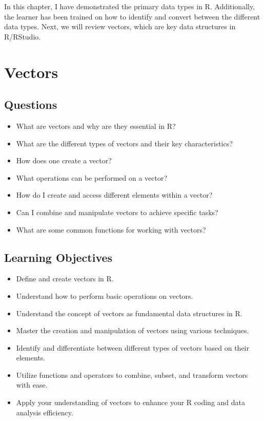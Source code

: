 \documentclass[
  letterpaper,
  DIV=11,
  numbers=noendperiod]{scrreprt}
\begin{document}
In this chapter, I have demonstrated the primary data types in R.
Additionally, the learner has been trained on how to identify and
convert between the different data types. Next, we will review vectors,
which are key data structures in R/RStudio.


\chapter{Vectors}\label{sec-vectors}

\section{Questions}\label{questions-8}

\begin{itemize}
\item
  What are vectors and why are they essential in R?
\item
  What are the different types of vectors and their key characteristics?
\item
  How does one create a vector?
\item
  What operations can be performed on a vector?
\item
  How do I create and access different elements within a vector?
\item
  Can I combine and manipulate vectors to achieve specific tasks?
\item
  What are some common functions for working with vectors?
\end{itemize}

\section{Learning Objectives}\label{learning-objectives-8}

\begin{itemize}
\item
  Define and create vectors in R.
\item
  Understand how to perform basic operations on vectors.
\item
  Understand the concept of vectors as fundamental data structures in R.
\item
  Master the creation and manipulation of vectors using various
  techniques.
\item
  Identify and differentiate between different types of vectors based on
  their elements.
\item
  Utilize functions and operators to combine, subset, and transform
  vectors with ease.
\item
  Apply your understanding of vectors to enhance your R coding and data
  analysis efficiency.
\end{itemize}
\end{document}
